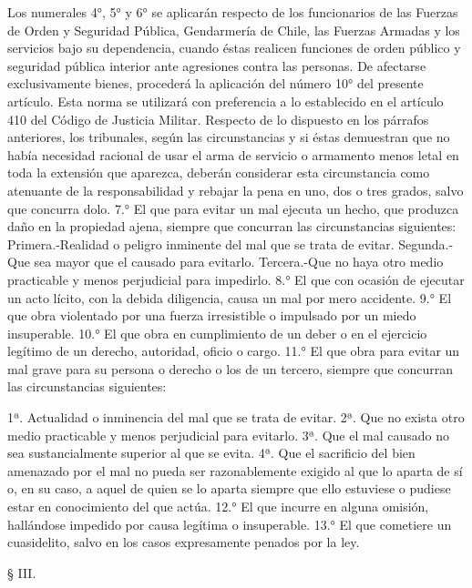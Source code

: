     Los numerales 4°, 5° y 6° se aplicarán respecto de los funcionarios de las Fuerzas de Orden y Seguridad Pública, Gendarmería de Chile, las Fuerzas Armadas y los servicios bajo su dependencia, cuando éstas realicen funciones de orden público y seguridad pública interior ante agresiones contra las personas. De afectarse exclusivamente bienes, procederá la aplicación del número 10° del presente artículo.
    Esta norma se utilizará con preferencia a lo establecido en el artículo 410 del Código de Justicia Militar.
    Respecto de lo dispuesto en los párrafos anteriores, los tribunales, según las circunstancias y si éstas demuestran que no había necesidad racional de usar el arma de servicio o armamento menos letal en toda la extensión que aparezca, deberán considerar esta circunstancia como atenuante de la responsabilidad y rebajar la pena en uno, dos o tres grados, salvo que concurra dolo.
    7.°  El que para evitar un mal ejecuta un hecho, que produzca daño en la propiedad ajena, siempre que concurran las circunstancias siguientes:
    Primera.-Realidad o peligro inminente del mal que se trata de evitar.
    Segunda.-Que sea mayor que el causado para evitarlo.
    Tercera.-Que no haya otro medio practicable y menos perjudicial para impedirlo.
    8.°  El que con ocasión de ejecutar un acto lícito, con la debida diligencia, causa un mal por mero accidente.
    9.°  El que obra violentado por una fuerza irresistible o impulsado por un miedo insuperable.
    10.° El que obra en cumplimiento de un deber o en el ejercicio legítimo de un derecho, autoridad, oficio o cargo.
    11.° El que obra para evitar un mal grave para su persona o derecho o los de un tercero, siempre que concurran las circunstancias siguientes:

    1ª. Actualidad o inminencia del mal que se trata de evitar.
    2ª. Que no exista otro medio practicable y menos perjudicial para evitarlo.
    3ª. Que el mal causado no sea sustancialmente superior al que se evita.
    4ª. Que el sacrificio del bien amenazado por el mal no pueda ser razonablemente exigido al que lo aparta de sí o, en su caso, a aquel de quien se lo aparta siempre que ello estuviese o pudiese estar en conocimiento del que actúa.
    12.° El que incurre en alguna omisión, hallándose impedido por causa legítima o insuperable.
    13.° El que cometiere un cuasidelito, salvo en los casos expresamente penados por la ley.






    § III.

